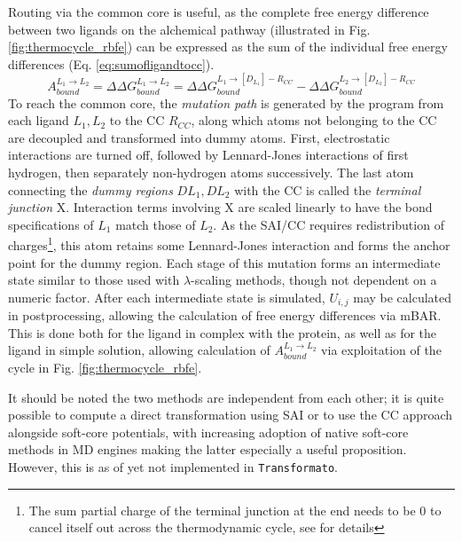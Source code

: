 \documentclass[oneside]{scrreprt}
\begin{document}
Routing via the common core is useful, as the complete free energy difference between two ligands on the alchemical pathway (illustrated in Fig. \ref{fig:thermocycle_rbfe}) can be expressed as the sum of the individual free energy differences (Eq. \ref{eq:sumofligandtocc}).
\begin{equation}\label{eq:sumofligandtocc}
    A^{L_1\rightarrow L_2}_{bound}=\Delta \Delta G_{bound}^{L_1\rightarrow L_2}=\Delta \Delta G^{L_1\rightarrow [D_{L_1}]-R_{CC}}_{bound}-\Delta \Delta G^{L_2\rightarrow [D_{L_2}]-R_{CC}}_{bound}
\end{equation}
To reach the common core, the \emph{mutation path} is generated by the program from each ligand $L_1, L_2$ to the CC $R_{CC}$, along which atoms not belonging to the CC are decoupled and transformed into dummy atoms. First, electrostatic interactions are turned off, followed by Lennard-Jones interactions of first hydrogen, then separately non-hydrogen atoms successively. The last atom connecting the \emph{dummy regions} $DL_1,DL_2$ with the CC is called the \emph{terminal junction} X. Interaction terms involving X are scaled linearly to have the bond specifications of $L_1$ match those of $L_2$. As the SAI/CC requires redistribution of charges\footnote{The sum partial charge of the terminal junction at the end needs to be 0 to cancel itself out across the thermodynamic cycle, see \cite{Karwou2022Jun,Wieder2022Jun} for details}, this atom retains some Lennard-Jones interaction and forms the anchor point for the dummy region. Each stage of this mutation forms an intermediate state similar to those used with $\lambda$-scaling methods, though not dependent on a numeric factor. After each intermediate state is simulated, $U_{i,j}$ may be calculated in postprocessing, allowing the calculation of free energy differences via mBAR. This is done both for the ligand in complex with the protein, as well as for the ligand in simple solution, allowing calculation of $A^{L_1\rightarrow L_2}_{bound}$ via exploitation of the cycle in Fig. \ref{fig:thermocycle_rbfe}.

It should be noted the two methods are independent from each other; it is quite possible to compute a direct transformation using SAI or to use the CC approach alongside soft-core potentials, with increasing adoption of native soft-core methods in MD engines making the latter especially a useful proposition. However, this is as of yet not implemented in \texttt{Transformato}.
\end{document}
